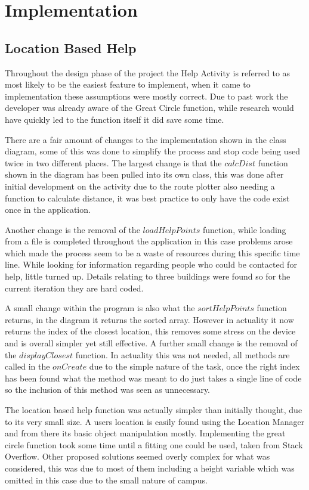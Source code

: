 \chapter{Implementation}

\section{Location Based Help}
Throughout the design phase of the project the Help Activity is referred to as most likely to be the easiest feature to implement, when it came to implementation these assumptions were mostly correct.  Due to past work the developer was already aware of the Great Circle function\cite{circle}, while research would have quickly led to the function itself it did save some time. 

There are a fair amount of changes to the implementation shown in the class diagram, some of this was done to simplify the process and stop code being used twice in two different places. The largest change is that the $calcDist$ function shown in the diagram has been pulled into its own class, this was done after initial development on the activity due to the route plotter also needing a function to calculate distance, it was best practice to only have the code exist once in the application.

Another change is the removal of the $loadHelpPoints$ function, while loading from a file is completed throughout the application in this case problems arose which made the process seem to be a waste of resources during this specific time line. While looking for information regarding people who could be contacted for help, little turned up. Details relating to three buildings were found so for the current iteration they are hard coded. 

A small change within the program is also what the $sortHelpPoints$ function returns, in the diagram it returns the sorted array. However in actuality it now returns the index of the closest location, this removes some stress on the device and is overall simpler yet still effective. A further small change is the removal of the $displayClosest$ function. In actuality this was not needed, all methods are called in the $onCreate$ due to the simple nature of the task, once the right index has been found what the method was meant to do just takes a single line of code so the inclusion of this method was seen as unnecessary.

The location based help function was actually simpler than initially thought, due to its very small size. A users location is easily found using the Location Manager and from there its basic object manipulation mostly. Implementing the great circle function took some time until a fitting one could be used, taken from Stack Overflow\cite{circlef}. Other proposed solutions seemed overly complex for what was considered, this was due to most of them including a height variable which was omitted in this case due to the small nature of campus. 

